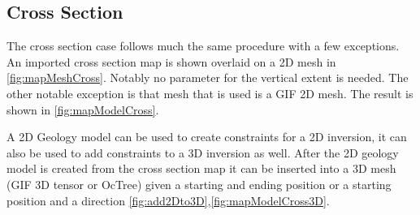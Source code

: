 \subsection{Cross Section}
\label{subsec:Make Geology Model from Map Cross Section}

The cross section case follows much the same procedure with a few exceptions. An imported cross section map is shown overlaid on a 2D mesh in \autoref{fig:mapMeshCross}. Notably no parameter for the vertical extent is needed. The other notable exception is that mesh that is used is a \ac{GIF} 2D mesh. The result is shown in \autoref{fig:mapModelCross}.  

A 2D Geology model can be used to create constraints for a 2D inversion, it can also be used to add constraints to a 3D inversion as well. After the 2D geology model is created from the cross section map it can be inserted into a 3D mesh (\ac{GIF} 3D tensor or OcTree) given a starting and ending position or a starting position and a direction \autoref{fig:add2Dto3D},\autoref{fig:mapModelCross3D}.

